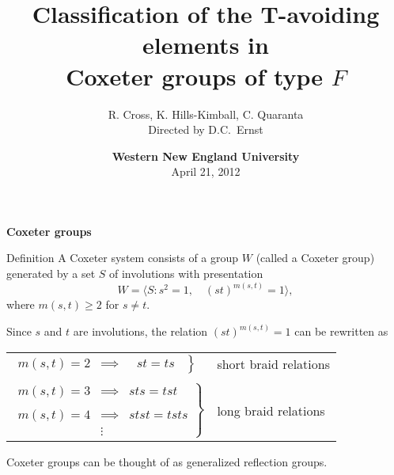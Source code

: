 \documentclass[9pt,handout]{beamer}
\newcommand{\<}{\langle}
\renewcommand{\>}{\rangle}
\begin{document}
\def\newblock{\hskip .11em plus .33em minus .07em}

\title[T-avoiding elements in Coxeter groups of type $F$]
{\textbf{Classification of the T-avoiding elements in\\
Coxeter groups of type $F$}}
\author[Cross, Hills-Kimball, Quaranta]{R. Cross, K. Hills-Kimball, C. Quaranta\\
Directed by D.C.~Ernst}
\date[Western New England University]{\textbf{Western New England University}\\
April 21, 2012}

\frame{\titlepage}


\begin{frame}{\textbf{Coxeter groups}}\pause

\begin{block}{Definition}
A {\color{red} Coxeter system} consists of a group $W$ (called a {\color{red}Coxeter group}) generated by a set $S$ of involutions with presentation \pause
	\[
    W=\<S: s^2=1,\quad (st)^{m(s,t)}=1\>,
    \]
where $m(s,t)\geq 2$ for $s\neq t$.
\end{block}

\pause

\vspace{1em}
    
Since $s$ and $t$ are involutions, the relation $(st)^{m(s,t)}=1$ can be rewritten as \pause
    
\begin{center}
\begin{tabular}{ll}
$\left.\begin{array}{lcc}m(s,t)=2 & \implies &\ \ \, st=ts\ \
\end{array}\right\}$& \alert{short braid relations}\\ \\ \pause
$\left.\begin{array}{lcc}m(s,t)=3 & \implies & sts=tst \\ & & \\ m(s,t)=4 & \implies & stst=tsts \\ & \vdots & \end{array}\right\}$ &\alert{long braid relations}
\end{tabular}
\end{center}

\vspace{1em}

\pause

Coxeter groups can be thought of as generalized reflection groups.

\end{frame}
\end{document}
